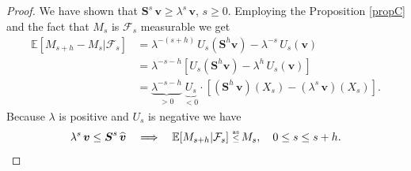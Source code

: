 \begin{proof}
We have shown that $\bm{S}^s\,\bm{v}\geq\lambda^s\,\bm{v}$, $s\geq0$. Employing  the Proposition \ref{propC} and the fact that $M_{s}$ is $\mathcal{F}_{s}$ measurable we get
\begin{align*}
\mathbb{E}[M_{s+h}-M_{s}|\mathcal{F}_{s}]&=\lambda^{-(s+h)}\,U_{s}(\bm{S}^h \bm{v}) - \lambda^{-s}\,U_{s}(\bm{v})\\
&=\lambda^{-s-h}[U_{s}(\bm{S}^h\bm{v})-\lambda^h\,U_{s}(\bm{v})]\\
&=\underbrace{\lambda^{-s-h}}_{> 0}\,\underbrace{U_{s}}_{< 0}\cdot[(\bm{S}^h\,\bm{v})(X_{s})-(\lambda^s\,\bm{v})(X_{s})].
\end{align*}
Because $\lambda$ is positive and $U_{s}$ is negative we have 
\[ \lambda^s\,\bm{v} \leq \bm{S}^s\,\widehat{\bm{v}} \quad \Longrightarrow \quad \mathbb{E}[M_{s+h}|\mathcal{F}_{s}]\asleq M_{s}, \quad 0\leq s \leq s+h. \qedhere\]
\end{proof}


